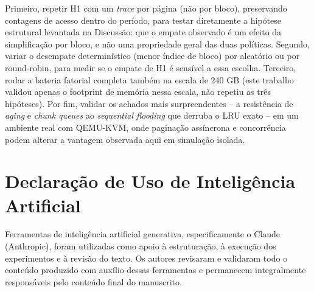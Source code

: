 \documentclass[12pt]{article}
\begin{document}
Primeiro, repetir H1 com um \textit{trace} por página (não por bloco), preservando contagens de acesso dentro do período, para testar diretamente a hipótese estrutural levantada na Discussão: que o empate observado é um efeito da simplificação por bloco, e não uma propriedade geral das duas políticas. Segundo, variar o desempate determinístico (menor índice de bloco) por aleatório ou por round-robin, para medir se o empate de H1 é sensível a essa escolha. Terceiro, rodar a bateria fatorial completa também na escala de 240 GB (este trabalho validou apenas o footprint de memória nessa escala, não repetiu as três hipóteses). Por fim, validar os achados mais surpreendentes -- a resistência de \textit{aging} e \textit{chunk queues} ao \textit{sequential flooding} que derruba o LRU exato -- em um ambiente real com QEMU-KVM, onde paginação assíncrona e concorrência podem alterar a vantagem observada aqui em simulação isolada.

\section*{Declaração de Uso de Inteligência Artificial}

Ferramentas de inteligência artificial generativa, especificamente o Claude (Anthropic), foram utilizadas como apoio à estruturação, à execução dos experimentos e à revisão do texto. Os autores revisaram e validaram todo o conteúdo produzido com auxílio dessas ferramentas e permanecem integralmente responsáveis pelo conteúdo final do manuscrito.



\end{document}
